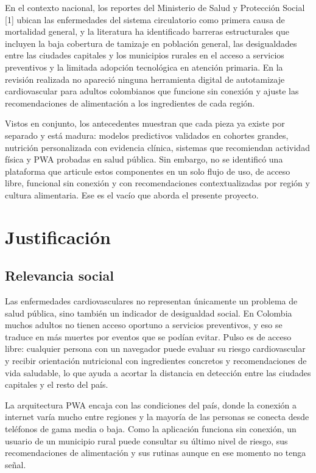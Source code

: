 \documentclass[conference]{IEEEtran}
\begin{document}
En el contexto nacional, los reportes del Ministerio de Salud y Protección Social [1] ubican las enfermedades del sistema circulatorio como primera causa de mortalidad general, y la literatura ha identificado barreras estructurales que incluyen la baja cobertura de tamizaje en población general, las desigualdades entre las ciudades capitales y los municipios rurales en el acceso a servicios preventivos y la limitada adopción tecnológica en atención primaria. En la revisión realizada no apareció ninguna herramienta digital de autotamizaje cardiovascular para adultos colombianos que funcione sin conexión y ajuste las recomendaciones de alimentación a los ingredientes de cada región.

Vistos en conjunto, los antecedentes muestran que cada pieza ya existe por separado y está madura: modelos predictivos validados en cohortes grandes, nutrición personalizada con evidencia clínica, sistemas que recomiendan actividad física y PWA probadas en salud pública. Sin embargo, no se identificó una plataforma que articule estos componentes en un solo flujo de uso, de acceso libre, funcional sin conexión y con recomendaciones contextualizadas por región y cultura alimentaria. Ese es el vacío que aborda el presente proyecto.

\section{Justificación}
\subsection{Relevancia social}
Las enfermedades cardiovasculares no representan únicamente un problema de salud pública, sino también un indicador de desigualdad social. En Colombia muchos adultos no tienen acceso oportuno a servicios preventivos, y eso se traduce en más muertes por eventos que se podían evitar. Pulso es de acceso libre: cualquier persona con un navegador puede evaluar su riesgo cardiovascular y recibir orientación nutricional con ingredientes concretos y recomendaciones de vida saludable, lo que ayuda a acortar la distancia en detección entre las ciudades capitales y el resto del país.

La arquitectura PWA encaja con las condiciones del país, donde la conexión a internet varía mucho entre regiones y la mayoría de las personas se conecta desde teléfonos de gama media o baja. Como la aplicación funciona sin conexión, un usuario de un municipio rural puede consultar su último nivel de riesgo, sus recomendaciones de alimentación y sus rutinas aunque en ese momento no tenga señal.
\end{document}
